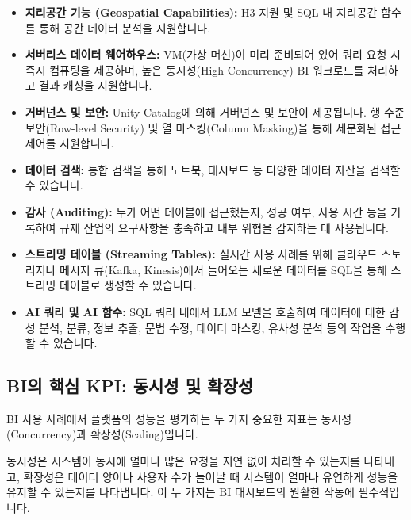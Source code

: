 \documentclass[11pt,a4paper]{article}
\theoremstyle{definition}
\begin{document}
\begin{itemize}
    \item \textbf{지리공간 기능 (Geospatial Capabilities):} H3 지원 및 SQL 내 지리공간 함수를 통해 공간 데이터 분석을 지원합니다.
    \item \textbf{서버리스 데이터 웨어하우스:} VM(가상 머신)이 미리 준비되어 있어 쿼리 요청 시 즉시 컴퓨팅을 제공하며, 높은 동시성(High Concurrency) BI 워크로드를 처리하고 결과 캐싱을 지원합니다.
    \item \textbf{거버넌스 및 보안:} Unity Catalog에 의해 거버넌스 및 보안이 제공됩니다. 행 수준 보안(Row-level Security) 및 열 마스킹(Column Masking)을 통해 세분화된 접근 제어를 지원합니다.
    \item \textbf{데이터 검색:} 통합 검색을 통해 노트북, 대시보드 등 다양한 데이터 자산을 검색할 수 있습니다.
    \item \textbf{감사 (Auditing):} 누가 어떤 테이블에 접근했는지, 성공 여부, 사용 시간 등을 기록하여 규제 산업의 요구사항을 충족하고 내부 위협을 감지하는 데 사용됩니다.
    \item \textbf{스트리밍 테이블 (Streaming Tables):} 실시간 사용 사례를 위해 클라우드 스토리지나 메시지 큐(Kafka, Kinesis)에서 들어오는 새로운 데이터를 SQL을 통해 스트리밍 테이블로 생성할 수 있습니다.
    \item \textbf{AI 쿼리 및 AI 함수:} SQL 쿼리 내에서 LLM 모델을 호출하여 데이터에 대한 감성 분석, 분류, 정보 추출, 문법 수정, 데이터 마스킹, 유사성 분석 등의 작업을 수행할 수 있습니다.
\end{itemize}

\subsection{BI의 핵심 KPI: 동시성 및 확장성}
BI 사용 사례에서 플랫폼의 성능을 평가하는 두 가지 중요한 지표는 동시성(Concurrency)과 확장성(Scaling)입니다.

\begin{summarybox}[title=핵심 요약: BI 시스템의 체력과 유연성]
동시성은 시스템이 동시에 얼마나 많은 요청을 지연 없이 처리할 수 있는지를 나타내고, 확장성은 데이터 양이나 사용자 수가 늘어날 때 시스템이 얼마나 유연하게 성능을 유지할 수 있는지를 나타냅니다. 이 두 가지는 BI 대시보드의 원활한 작동에 필수적입니다.
\end{summarybox}
\end{document}

